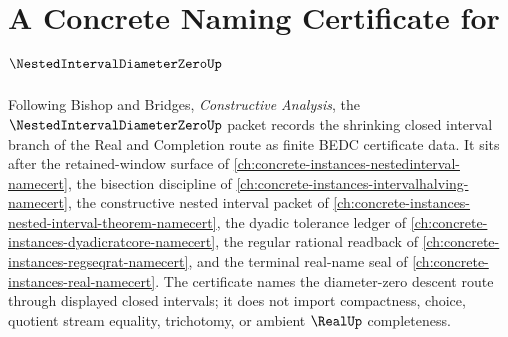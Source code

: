 \chapter{A Concrete Naming Certificate for $\NestedIntervalDiameterZeroUp$}
\label{ch:concrete-instances-nested-interval-diameter-zero-namecert}

Following Bishop and Bridges, \emph{Constructive Analysis}, the $\NestedIntervalDiameterZeroUp$ packet records the shrinking closed interval branch of the Real and Completion route as finite BEDC certificate data. It sits after the retained-window surface of \autoref{ch:concrete-instances-nestedinterval-namecert}, the bisection discipline of \autoref{ch:concrete-instances-intervalhalving-namecert}, the constructive nested interval packet of \autoref{ch:concrete-instances-nested-interval-theorem-namecert}, the dyadic tolerance ledger of \autoref{ch:concrete-instances-dyadicratcore-namecert}, the regular rational readback of \autoref{ch:concrete-instances-regseqrat-namecert}, and the terminal real-name seal of \autoref{ch:concrete-instances-real-namecert}. The certificate names the diameter-zero descent route through displayed closed intervals; it does not import compactness, choice, quotient stream equality, trichotomy, or ambient $\RealUp$ completeness.

